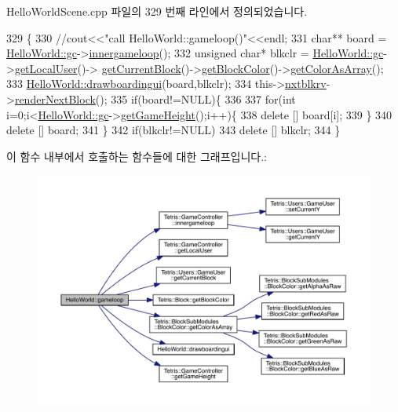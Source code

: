 Hello\+World\+Scene.\+cpp 파일의 329 번째 라인에서 정의되었습니다.


\begin{DoxyCode}
329                                  \{
330     \textcolor{comment}{//cout<<"call HelloWorld::gameloop()"<<endl;}
331     \textcolor{keywordtype}{char}** board = \hyperlink{class_hello_world_a547cb213126911d9a7151f8259dc7102}{HelloWorld::gc}->\hyperlink{class_tetris_1_1_game_controller_a9dd5159934835ef54cb3c0b24cbc1fd6}{innergameloop}();
332     \textcolor{keywordtype}{unsigned} \textcolor{keywordtype}{char}* blkclr = \hyperlink{class_hello_world_a547cb213126911d9a7151f8259dc7102}{HelloWorld::gc}->\hyperlink{class_tetris_1_1_game_controller_abc67d4b309ce2886b43a3b4e0af22abc}{getLocalUser}()->
      \hyperlink{class_tetris_1_1_users_1_1_game_user_a3d4bcc74d518c28356012f8a42b85896}{getCurrentBlock}()->\hyperlink{class_tetris_1_1_block_ad61aea379870fbb3668d49e4c3c748ed}{getBlockColor}()->\hyperlink{class_tetris_1_1_block_sub_modules_1_1_block_color_ac626961ee3894d89a7fc961e9f40c92f}{getColorAsArray}();
333     \hyperlink{class_hello_world_a0456ce3ab8880643c5e8739634156d93}{HelloWorld::drawboardingui}(board,blkclr);
334     this->\hyperlink{class_hello_world_ac06ca16fc5a18d32c58e0229c24817f6}{nxtblkrv}->\hyperlink{class_tetris_1_1_views_1_1_next_block_render_behavior_aa9240528e0603ca129d7877f9e71b27d}{renderNextBlock}();
335     \textcolor{keywordflow}{if}(board!=NULL)\{
336         
337         \textcolor{keywordflow}{for}(\textcolor{keywordtype}{int} i=0;i<\hyperlink{class_hello_world_a547cb213126911d9a7151f8259dc7102}{HelloWorld::gc}->\hyperlink{class_tetris_1_1_game_controller_a10163479e02572450b886ff0654078b4}{getGameHeight}();i++)\{
338             \textcolor{keyword}{delete} [] board[i];
339         \}
340         \textcolor{keyword}{delete} [] board;
341     \}
342     \textcolor{keywordflow}{if}(blkclr!=NULL)
343     \textcolor{keyword}{delete} [] blkclr;
344 \}
\end{DoxyCode}
이 함수 내부에서 호출하는 함수들에 대한 그래프입니다.\+:
\nopagebreak
\begin{figure}[H]
\begin{center}
\leavevmode
\includegraphics[width=350pt]{d9/d98/class_hello_world_af59f38fb445c1302e5d2f7e18d0ab0e5_cgraph}
\end{center}
\end{figure}
